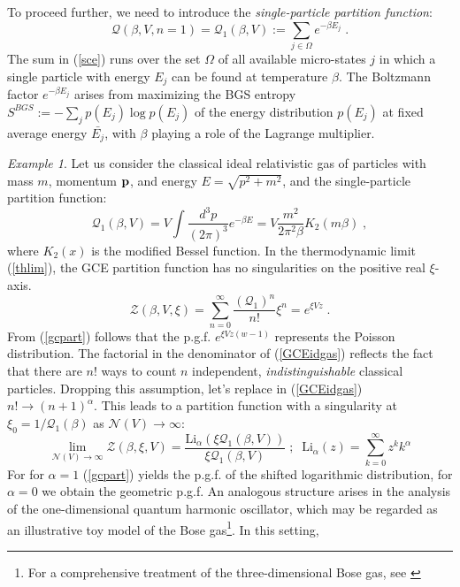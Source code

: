 \documentclass[a4paper,12pt]{amsart}
\theoremstyle{definition}
\theoremstyle{remark}
\newtheorem{Example}{Example}[section]
\begin{document}
To proceed further, we need to introduce the {\it single-particle partition function}:  
\begin{equation}\label{sce}
\mathcal{Q}(\beta, V, n=1)=\mathcal{Q}_1(\beta, V):=\sum_{j\in \Omega} e^{-\beta E_j}\;.  \end{equation}
 The sum in (\ref{sce}) runs over the set $\Omega$ of all available micro-states $j$ in which a single particle with energy $E_j$  can be found at temperature $\beta$. The Boltzmann factor $e^{-\beta E_j}$ arises from maximizing the BGS entropy $S^{BGS}:=-\sum_j p(E_j)\log p(E_j)$ of the energy distribution $p(E_j)$ at fixed average energy $\bar{E_j}$, with $\beta$  playing a role of the Lagrange multiplier. 

 \begin{Example}
 Let us consider the classical ideal relativistic gas of particles with mass $m$, momentum ${\bf p}$, and energy $E=\sqrt{p^2+m^2}$, and the single-particle partition function:
\begin{equation}\label{irg}
\mathcal{Q}_1(\beta,V)= V\int \frac{d^3 p}{(2\pi)^3}e^{-\beta E}=V\frac{m^2}{2 \pi^2\beta }K_2\left(m \beta \right)\;,
\end{equation}
where $K_2(x)$ is the modified Bessel function. In the thermodynamic limit (\ref{thlim}), the GCE partition function has no singularities on the positive real $\xi$-axis. 
\begin{equation}\label{GCEidgas}
\mathcal{Z}(\beta,V,\xi)=\sum_{n=0}^{\infty} \frac{(\mathcal{Q}_1)^n}{n!}\xi^n=e^{\xi V z}\;.
\end{equation}
From (\ref{gcpart}) follows that the p.g.f. $e^{\xi V z(w-1)}$ represents the Poisson distribution.
The factorial in the denominator of (\ref{GCEidgas}) reflects the fact that there are $n!$ ways to count $n$ independent, {\it indistinguishable} classical particles. Dropping this assumption, let's replace in (\ref{GCEidgas}) $n! \to (n+1)^{\alpha}$.  This leads to a partition function with a singularity at $\xi_0=1/\mathcal{Q}_1(\beta)$ as $\mathcal{N}(V)\to\infty$: 
\[
\lim_{\mathcal{N}(V)\to\infty} \mathcal{Z}(\beta, \xi,V)=\frac{\text{Li}_{\alpha }(\xi \mathcal{Q}_1(\beta,V))}{\xi \mathcal{Q}_1(\beta,V)}\;;\;\; \text{Li}_{\alpha }(z)=\sum_{k=0}^{\infty}z^k k^{\alpha}
\]
For for $\alpha\!=\!1$ (\ref{gcpart}) yields the p.g.f. of the shifted logarithmic distribution, for  $\alpha=0$ we obtain the geometric p.g.f.
An analogous structure arises in the analysis of the one-dimensional quantum harmonic oscillator, which may be regarded as an illustrative toy model of the Bose gas\footnote{For a comprehensive treatment of the three-dimensional Bose gas, see \cite{Lanlif}}. In this setting, 

\end{Example}
\end{document}
